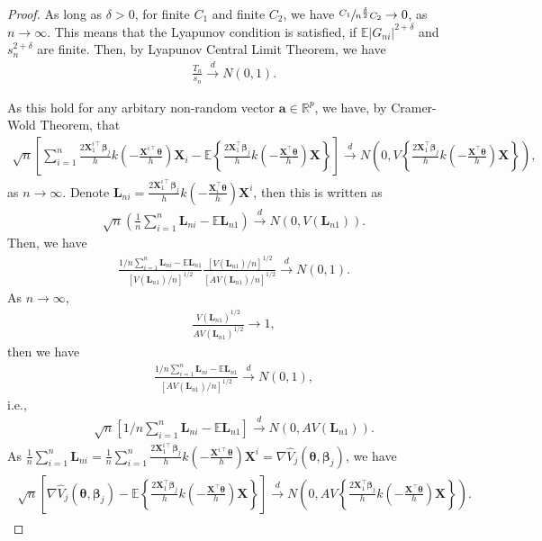 \documentclass{article}
\newcommand{\bs}{ \boldsymbol}
\newcommand{\lt}{\left}
\newcommand{\rt}{\right}
\begin{document}
\begin{appendices}
\begin{proof}
	As long as $\delta>0$, for finite $C_1$ and finite $C_2$, we have $\sfrac{C_{1}}{n^{\frac{\delta}{2}}C_{2}}\to0$,
	as $n\to\infty$. This means that the Lyapunov condition is satisfied, if $\mathbb{E}\lt|G_{ni}\rt|^{2+\delta}$ and $s_{n}^{2+\delta}$ are finite. Then,  by Lyapunov Central Limit Theorem, we have
	\begin{gather*}
	\frac{T_{n}}{s_{n}}\overset{d}{\to}N(0,1).
	\end{gather*}
	
	As this hold for any arbitary non-random vector $\bs{a}\in \mathbb{R}^p$, we have, by Cramer-Wold Theorem, that
	\begin{gather*}
	\sqrt{n}\lt[\sum_{i=1}^{n}\frac{2\bs{X}_{1}^{i\intercal}\bs{\beta}_j}{h}k\lt(-\frac{\bs{X}^{i\intercal}\bs{\theta}}{h}\rt)\bs{X}_{i}-\mathbb{E}\lt\{\frac{2\bs{X}_{1}^{\intercal}\bs{\beta}_j}{h}k\lt(-\frac{\bs{X}^{\intercal}\bs{\theta}}{h}\rt)\bs{X}\rt\}\rt]\overset{d}{\to}N\lt(0,V\lt\{\frac{2\bs{X}_{1}^{\intercal}\bs{\beta}_j}{h}k\lt(-\frac{\bs{X}^{\intercal}\bs{\theta}}{h}\rt)\bs{X}\rt\}\rt),
	\end{gather*}
	as $n \to \infty$. Denote $\bs{L}_{ni}=\frac{2\bs{X}_{1}^{i\intercal}\bs{\beta}_j}{h}k\lt(-\frac{\bs{X}_{i}^{\intercal}\bs{\theta}}{h}\rt)\bs{X}^{i}$,
	then this is written as
	\begin{gather*}
	\sqrt{n}\lt(\frac{1}{n}\sum_{i=1}^{n}\bs{L}_{ni}-\mathbb{E}\bs{L}_{n1}\rt)\overset{d}{\to}N\lt(0,V\lt(\bs{L}_{n1}\rt)\rt).
	\end{gather*}
	Then, we have
	\begin{gather*}
	\frac{1/n\sum_{i=1}^{n}\bs{L}_{ni}-\mathbb{E}\bs{L}_{n1}}{[V(\bs{L}_{n1})/n]^{1/2}}\frac{[V(\bs{L}_{n1})/n]^{1/2}}{\lt[AV(\bs{L}_{n1})/n\rt]^{1/2}}\overset{d}{\to}N(0,1).
	\end{gather*}
	As  $n \to \infty$, 
	\begin{gather*}
	\frac{V(\bs{L}_{n1})^{1/2}}{AV(\bs{L}_{n1})^{1/2}}\to1,
	\end{gather*}
	then we have
	\begin{gather*}
	\frac{1/n\sum_{i=1}^{n}\bs{L}_{ni}-\mathbb{E}\bs{L}_{n1}}{[AV(\bs{L}_{n1})/n]^{1/2}}\overset{d}{\to}N(0,1),
	\end{gather*}
	i.e.,
	\begin{gather*}
	\sqrt{n}\lt[1/n\sum_{i=1}^{n}\bs{L}_{ni}-\mathbb{E}\bs{L}_{n1}\rt]\overset{d}{\to}N\lt(0,AV(\bs{L}_{n1})\rt).
	\end{gather*}
	As $\frac{1}{n}\sum_{i=1}^{n}\bs{L}_{ni} = \frac{1}{n}\sum_{i=1}^n\frac{2\bs{X}_{1}^{i\intercal}\bs{\beta}_j}{h}k\lt(-\frac{\bs{X}^{i\intercal}\bs{\theta}}{h}\rt)\bs{X}^{i} =\nabla\widehat{V}_j\lt(\bs{\theta}, \bs{\beta}_j\rt)$, we have
	\begin{gather}
	\begin{flalign*}
	\sqrt{n}\lt[\nabla\widehat{V}_j\lt(\bs{\theta}, \bs{\beta}_j\rt) -\mathbb{E}\lt\{\frac{2\bs{X}_{1}^{\intercal}\bs{\beta}_j}{h}k\lt(-\frac{\bs{X}^{\intercal}\bs{\theta}}{h}\rt)\bs{X}\rt\}\rt]\overset{d}{\to}N\lt(0,AV\lt\{\frac{2\bs{X}_1^{\intercal}\bs{\beta}_j}{h}k\lt(-\frac{\bs{X}^{\intercal}\bs{\theta}}{h}\rt)\bs{X}\rt\}\rt).
	\end{flalign*}
	\end{gather}
\end{proof}

\end{appendices}
\end{document}
